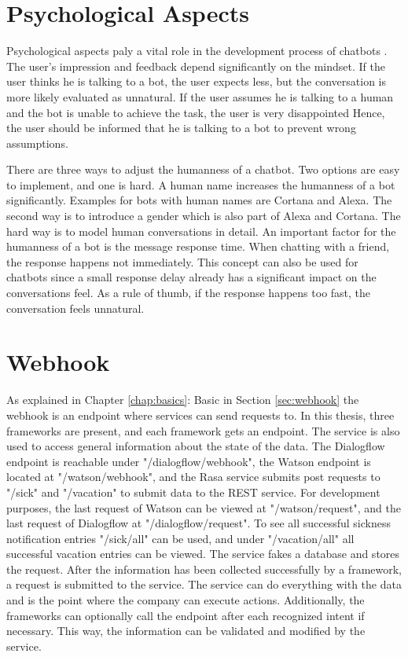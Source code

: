 \section{Psychological Aspects}
Psychological aspects paly a vital role in the development process of chatbots \citet{brandtzaeg2018chatbots}.
The user's impression and feedback depend significantly on the mindset.
If the user thinks he is talking to a bot, the user expects less, but the conversation is more likely evaluated as unnatural.
If the user assumes he is talking to a human and the bot is unable to achieve the task, the user is very disappointed
Hence, the user should be informed that he is talking to a bot to prevent wrong assumptions.

There are three ways to adjust the humanness of a chatbot.
Two options are easy to implement, and one is hard.
A human name increases the humanness of a bot significantly.
Examples for bots with human names are Cortana and Alexa.
The second way is to introduce a gender which is also part of Alexa and Cortana.
The hard way is to model human conversations in detail.
An important factor for the humanness of a bot is the message response time.
When chatting with a friend, the response happens not immediately.
This concept can also be used for chatbots since a small response delay already has a significant impact on the conversations feel.
As a rule of thumb, if the response happens too fast, the conversation feels unnatural.

\section{Webhook}
As explained in Chapter \ref{chap:basics}: Basic in Section \ref{sec:webhook} the webhook is an endpoint where services can send requests to.
In this thesis, three frameworks are present, and each framework gets an endpoint.
The service is also used to access general information about the state of the data.
The Dialogflow endpoint is reachable under "/dialogflow/webhook",
the Watson endpoint is located at "/watson/webhook", and the Rasa service submits post requests to "/sick" and "/vacation" to submit data to the REST service.
For development purposes, the last request of Watson can be viewed at "/watson/request", and the last request of Dialogflow at "/dialogflow/request".
To see all successful sickness notification entries "/sick/all" can be used, and under "/vacation/all" all successful vacation entries can be viewed.
The service fakes a database and stores the request.
After the information has been collected successfully by a framework, a request is submitted to the service.
The service can do everything with the data and is the point where the company can execute actions.
Additionally, the frameworks can optionally call the endpoint after each recognized intent if necessary.
This way, the information can be validated and modified by the service.


